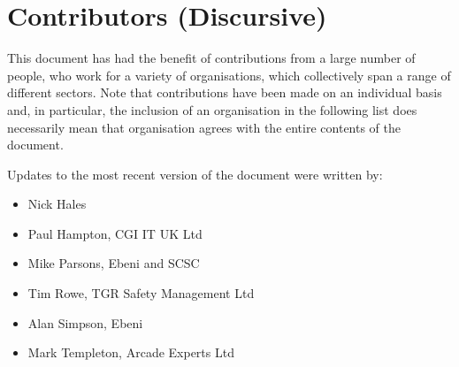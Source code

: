 %
%
\section{Contributors (Discursive)} \label{bkm:contributors}


This document has had the benefit of contributions from a large number of people, who work for a variety of organisations, which collectively span a range of different sectors. Note that contributions  have been made on an individual basis and, in particular, the inclusion of an organisation in the following list does  necessarily mean that organisation agrees with the entire contents of the document.

Updates to the most recent version of the document were written by:
\begin{itemize}
  \item Nick Hales
  \item Paul Hampton, CGI IT UK Ltd
  \item Mike Parsons, Ebeni and SCSC
  \item Tim Rowe, TGR Safety Management Ltd
  \item Alan Simpson, Ebeni
  \item Mark Templeton, Arcade Experts Ltd
\end{itemize}

  
